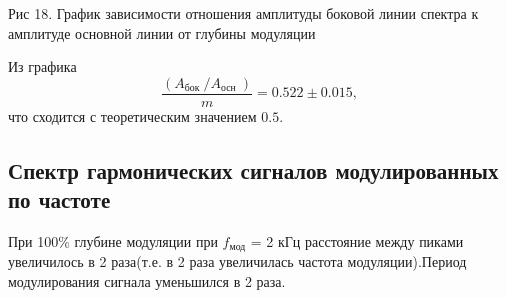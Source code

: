 \documentclass[a4paper,12pt]{article} %
\begin{document}
\begin{center}
                    \begin{center}
                    {Рис 18.} График зависимости отношения амплитуды боковой линии спектра к амплитуде основной линии от глубины модуляции\\
                    \end{center}
                \end{center}

Из графика
$$\frac{\left(A_{\text {бок }} / A_{\text {осн }}\right)}{m} = 0.522\pm0.015,$$
что сходится с теоретическим значением $0.5$.

\subsection{Спектр гармонических сигналов модулированных по частоте}

При 100\% глубине модуляции при $f_{\text{мод}}$ = 2 кГц расстояние между пиками увеличилось в 2 раза(т.е. в 2 раза увеличилась частота модуляции).Период модулирования сигнала уменьшился в 2 раза.
\end{document}
